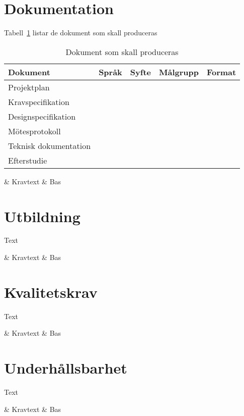 \documentclass[10pt,oneside,swedish]{lips}
\begin{document}
\section{Dokumentation} 
Tabell~\ref{tab:doks} listar de dokument som skall produceras
\begin{table}[htbp]
  \centering
  \caption{Dokument som skall produceras}
  \label{tab:doks}
  \begin{tabular}{|l|l|l|l|l|}
    \hline
    Dokument & Språk & Syfte & Målgrupp & Format\\
    \hline
    Projektplan &&&&\\
    Kravspecifikation &&&&\\
    Designspecifikation &&&&\\
    Mötesprotokoll &&&&\\
    Teknisk dokumentation &&&&\\
    Efterstudie &&&&\\
    \hline
  \end{tabular}  
\end{table}

\begin{requirements}
  \requirementno & Kravtext & Bas\\
\end{requirements}

\section{Utbildning}
Text
\begin{requirements}
  \requirementno & Kravtext & Bas\\
\end{requirements}

\section{Kvalitetskrav}
Text
\begin{requirements}
  \requirementno & Kravtext & Bas\\
\end{requirements}

\section{Underhållsbarhet}
Text
\begin{requirements}
  \requirementno & Kravtext & Bas\\
\end{requirements}
\end{document}
